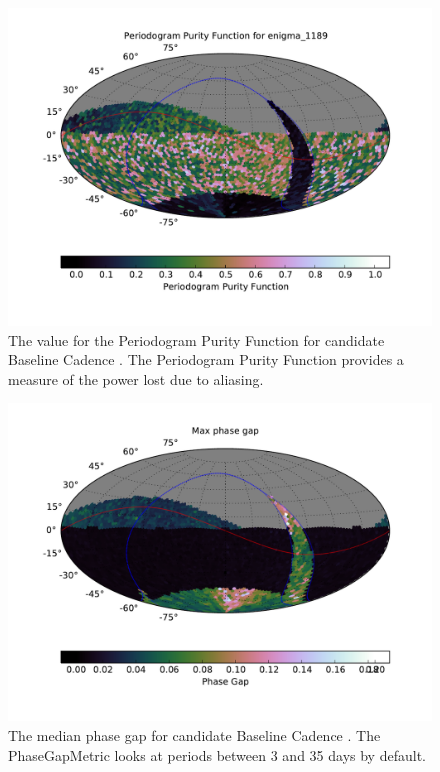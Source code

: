 \begin{figure}[tbh!]
\includegraphics{figs/variables/enigma_1189_PeriodogramPurity_OPSI_SkyMap.pdf}
\caption{The value for the Periodogram Purity Function for candidate Baseline Cadence .
The Periodogram Purity Function provides a measure of the power lost due to aliasing.}
\label{fig:enigmaPeriodogramPurity}
\end{figure}


\begin{figure}[tbh!]
\includegraphics{figs/variables/enigma_1189_Phase_Gap_MedianGap_OPSI_SkyMap.pdf}
\caption{The median phase gap for candidate Baseline Cadence .
The PhaseGapMetric looks at periods between 3 and 35 days by default.}
\label{fig:enigmaMedianGap}
\end{figure}

